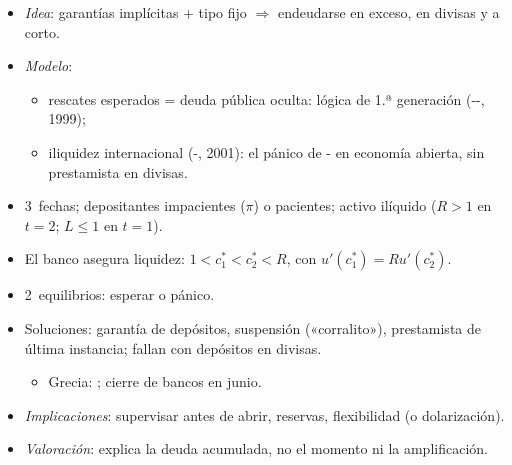 \documentclass{article}
\begin{document}
\begin{columnas}
\begin{itemize}
\item \emph{Idea}: garantías implícitas + tipo fijo $\Rightarrow$ endeudarse en exceso, en divisas y a corto.
\item \emph{Modelo}:
  \begin{itemize}
  \item rescates esperados = deuda pública oculta: lógica de 1.ª generación (--, 1999);
  \item iliquidez internacional (-, 2001): el pánico de - en economía abierta, sin prestamista en divisas.
  \end{itemize}
\end{itemize}
\begin{itemize}
\item 3~fechas; depositantes impacientes ($\pi$) o pacientes; activo ilíquido ($R>1$ en $t=2$; $L\le1$ en $t=1$).
\item El banco asegura liquidez: $1<c_1^*<c_2^*<R$, con $u'(c_1^*)=Ru'(c_2^*)$.
\item 2~equilibrios: esperar o pánico.
\item Soluciones: garantía de depósitos, suspensión («corralito»), prestamista de última instancia; fallan con depósitos en divisas.
  \begin{itemize}
  \item Grecia: ; cierre de bancos en junio.
  \end{itemize}
\end{itemize}
\begin{itemize}
\item \emph{Implicaciones}: supervisar antes de abrir, reservas, flexibilidad (o dolarización).
\item \emph{Valoración}: explica la deuda acumulada, no el momento ni la amplificación.
\end{itemize}


\end{columnas}
\end{document}
